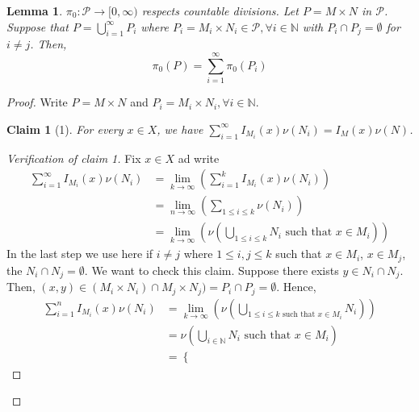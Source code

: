 \documentclass[letterpaper, 12pt]{article}
\newcommand{\bN}{\mathbb{N}}
\newcommand{\cP}{\mathcal{P}}
\providecommand{\mbrac}[1] {\left( #1 \right)}
\theoremstyle{stdthm}
\newtheorem{lem}[thm]{Lemma}
\theoremstyle{stddef}
\theoremstyle{stdnonum}
\newtheorem{claim}{Claim}
\theoremstyle{stdqands}
\theoremstyle{stdbold}
\begin{document}
\begin{lem}
$\pi_0: \cP \to [0,\infty)$ respects countable divisions. Let $P = M \times N$ in $\cP$. Suppose that $P = \bigcup_{i=1}^\infty P_i$ where $P_i = M_i \times N_i \in \cP, \forall i \in \bN$ with $P_i \cap P_j = \emptyset$ for $i \neq j$. Then, 
\[ \pi_0 (P) = \sum_{i=1}^\infty \pi_0(P_i) \]
\end{lem}

\begin{proof}
Write $P = M \times N$ and $P_i = M_i \times N_i, \forall i \in \bN$. 

\begin{claim}[1]
For every $x \in X$, we have $\sum_{i=1}^\infty  I_{M_i} (x) \nu(N_i) = I_M(x) \nu(N)$. 
\end{claim}

\begin{proof}[Verification of claim 1]
Fix $x \in X$ ad write 
\begin{align*}
\sum_{i=1}^\infty I_{M_i}(x) \nu(N_i) &= \lim_{k\rightarrow \infty} \left( \sum_{i=1}^k I_{M_i}(x) \nu(N_i)\right)\\
&= \lim_{n\rightarrow \infty} \left( \sum_{1 \leq i \leq k} \nu(N_i) \right) \\
&= \lim_{k\rightarrow \infty}  \left( \nu \left( \bigcup_{1 \leq i \leq k} N_i \text{ such that } x \in M_i \right)\right)
\end{align*}
In the last step we use here if $i \neq j$ where $1 \leq i, j \leq k$ such that $x \in M_i$, $x \in M_j$, the $N_i \cap N_j = \emptyset$. We want to check this claim. Suppose there exists $y \in N_i \cap N_j$. Then, $(x,y) \in( M_i \times N_i) \cap M_j \times N_j) = P_i \cap P_j = \emptyset$. Hence, 
\begin{align*}
\sum_{i=1}^n I_{M_i} (x) \nu(N_i) &= \lim_{k\rightarrow \infty} \left( \nu \left( \bigcup_{1 \leq i \leq k \text{ such that } x \in M_i} N_i \right)\right)\\
& = \nu \mbrac{\bigcup_{i \in \bN} N_i \text{ such that } x \in M_i}\\
&= \begin{cases}

\end{cases}
\end{align*}
\end{proof}
\end{proof}
\end{document}
